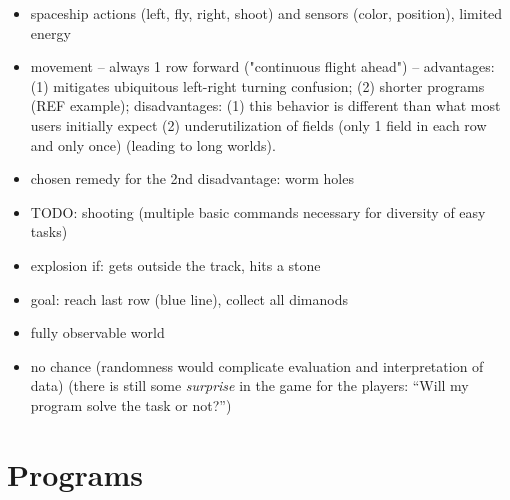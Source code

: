 \begin{itemize}
\item spaceship actions (left, fly, right, shoot) and sensors (color, position), limited energy
\item movement -- always 1 row forward ("continuous flight ahead") --
  advantages:
  (1) mitigates ubiquitous left-right turning confusion;
  (2) shorter programs (REF example);
  disadvantages:
  (1) this behavior is different than what most users initially expect
  (2) underutilization of fields (only 1 field in each row and only once)
      (leading to long worlds).
\item chosen remedy for the 2nd disadvantage: worm holes
\item TODO: shooting (multiple basic commands necessary for diversity of easy tasks)
\item explosion if: gets outside the track, hits a stone
\item goal: reach last row (blue line), collect all dimanods
\item fully observable world
\item no chance (randomness would complicate evaluation and interpretation
  of data) (there is still some \emph{surprise} in the game for the players:
  ``Will my program solve the task or not?'')
\end{itemize}





\section{Programs}
\label{sec:robomission.programs}

